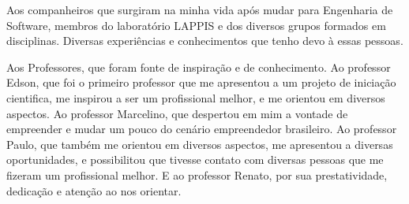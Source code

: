Aos companheiros que surgiram na minha vida após mudar para Engenharia de Software,
membros do laboratório LAPPIS e dos diversos grupos formados em disciplinas. Diversas
experiências e conhecimentos que tenho devo à essas pessoas.

Aos Professores, que foram fonte de inspiração e de conhecimento. Ao professor
Edson, que foi o primeiro professor que me apresentou a um projeto de iniciação
cientifica, me inspirou a ser um profissional melhor, e me orientou em diversos
aspectos. Ao professor Marcelino, que despertou em mim a vontade de empreender
e mudar um pouco do cenário empreendedor brasileiro. Ao professor Paulo, que
também me orientou em diversos aspectos, me apresentou a diversas oportunidades,
e possibilitou que tivesse contato com diversas pessoas que me fizeram um
profissional melhor. E ao professor Renato, por sua prestatividade, dedicação
e atenção ao nos orientar.
